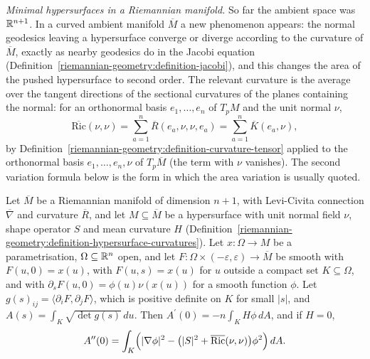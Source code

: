 \emph{Minimal hypersurfaces in a Riemannian manifold.} So far the ambient space was $\mathbb{R}^{n+1}$. In a curved ambient manifold $\overline{M}$ a new phenomenon appears: the normal
geodesics leaving a hypersurface converge or diverge according to the curvature of $\overline{M}$, exactly as nearby geodesics do in the Jacobi equation
(Definition~\ref{riemannian-geometry:definition-jacobi}), and this changes the area of the pushed hypersurface to second order. The relevant curvature is the average over the
tangent directions of the sectional curvatures of the planes containing the normal: for an orthonormal basis $e_1, \ldots, e_n$ of $T_pM$ and the unit normal $\nu$,
\[
\overline{\mathrm{Ric}}(\nu, \nu) = \sum_{a=1}^n\overline{R}(e_a, \nu, \nu, e_a) = \sum_{a=1}^n\overline{K}(e_a, \nu),
\]
by Definition~\ref{riemannian-geometry:definition-curvature-tensor} applied to the orthonormal basis $e_1, \ldots, e_n, \nu$ of $T_p\overline{M}$ (the term with $\nu$ vanishes). The
second variation formula below is the form in which the area variation is usually quoted.

\begin{proposition}\label{riemannian-geometry:proposition-variation-area-riemannian}
Let $\overline{M}$ be a Riemannian manifold of dimension $n + 1$, with Levi-Civita connection $\overline{\nabla}$ and curvature $\overline{R}$, and let $M \subseteq \overline{M}$ be a
hypersurface with unit normal field $\nu$, shape operator $S$ and mean curvature $H$ (Definition~\ref{riemannian-geometry:definition-hypersurface-curvatures}). Let
$x \colon \Omega \to M$ be a parametrisation, $\Omega \subseteq \mathbb{R}^n$ open, and let $F \colon \Omega \times (-\varepsilon, \varepsilon) \to \overline{M}$ be smooth with $F(u, 0) = x(u)$,
with $F(u, s) = x(u)$ for $u$ outside a compact set $K \subseteq \Omega$, and with $\partial_sF(u, 0) = \phi(u)\nu(x(u))$ for a smooth function $\phi$. Let
$g(s)_{ij} = \langle\partial_iF, \partial_jF\rangle$, which is positive definite on $K$ for small $|s|$, and $A(s) = \int_K\sqrt{\det g(s)}\,du$. Then $A^{\prime}(0) = -n\int_KH\phi\,dA$,
and if $H = 0$,
\[
A^{\prime\prime}(0) = \int_K\Bigl(|\nabla\phi|^2 - \bigl(|S|^2 + \overline{\mathrm{Ric}}(\nu, \nu)\bigr)\phi^2\Bigr)\,dA .
\]
\end{proposition}

